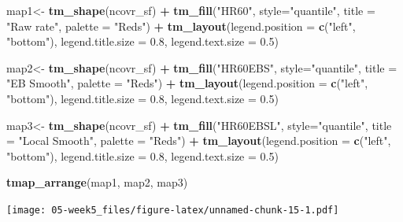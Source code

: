 \documentclass[]{book}
\newenvironment{Shaded}{\begin{snugshade}}{\end{snugshade}}
\newcommand{\DataTypeTok}[1]{\textcolor[rgb]{0.13,0.29,0.53}{#1}}
\newcommand{\FloatTok}[1]{\textcolor[rgb]{0.00,0.00,0.81}{#1}}
\newcommand{\KeywordTok}[1]{\textcolor[rgb]{0.13,0.29,0.53}{\textbf{#1}}}
\newcommand{\NormalTok}[1]{#1}
\newcommand{\OperatorTok}[1]{\textcolor[rgb]{0.81,0.36,0.00}{\textbf{#1}}}
\newcommand{\StringTok}[1]{\textcolor[rgb]{0.31,0.60,0.02}{#1}}
\begin{document}
\begin{Shaded}
\begin{Highlighting}[]
\NormalTok{map1<-}\StringTok{ }\KeywordTok{tm_shape}\NormalTok{(ncovr_sf) }\OperatorTok{+}\StringTok{ }
\StringTok{  }\KeywordTok{tm_fill}\NormalTok{(}\StringTok{"HR60"}\NormalTok{, }\DataTypeTok{style=}\StringTok{"quantile"}\NormalTok{, }\DataTypeTok{title =} \StringTok{"Raw rate"}\NormalTok{, }\DataTypeTok{palette =} \StringTok{"Reds"}\NormalTok{) }\OperatorTok{+}
\StringTok{  }\KeywordTok{tm_layout}\NormalTok{(}\DataTypeTok{legend.position =} \KeywordTok{c}\NormalTok{(}\StringTok{"left"}\NormalTok{, }\StringTok{"bottom"}\NormalTok{), }
            \DataTypeTok{legend.title.size =} \FloatTok{0.8}\NormalTok{,}
            \DataTypeTok{legend.text.size =} \FloatTok{0.5}\NormalTok{)}

\NormalTok{map2<-}\StringTok{ }\KeywordTok{tm_shape}\NormalTok{(ncovr_sf) }\OperatorTok{+}\StringTok{ }
\StringTok{  }\KeywordTok{tm_fill}\NormalTok{(}\StringTok{"HR60EBS"}\NormalTok{, }\DataTypeTok{style=}\StringTok{"quantile"}\NormalTok{, }\DataTypeTok{title =} \StringTok{"EB Smooth"}\NormalTok{, }\DataTypeTok{palette =} \StringTok{"Reds"}\NormalTok{) }\OperatorTok{+}
\StringTok{  }\KeywordTok{tm_layout}\NormalTok{(}\DataTypeTok{legend.position =} \KeywordTok{c}\NormalTok{(}\StringTok{"left"}\NormalTok{, }\StringTok{"bottom"}\NormalTok{), }
            \DataTypeTok{legend.title.size =} \FloatTok{0.8}\NormalTok{,}
            \DataTypeTok{legend.text.size =} \FloatTok{0.5}\NormalTok{)}

\NormalTok{map3<-}\StringTok{ }\KeywordTok{tm_shape}\NormalTok{(ncovr_sf) }\OperatorTok{+}\StringTok{ }
\StringTok{  }\KeywordTok{tm_fill}\NormalTok{(}\StringTok{"HR60EBSL"}\NormalTok{, }\DataTypeTok{style=}\StringTok{"quantile"}\NormalTok{, }\DataTypeTok{title =} \StringTok{"Local Smooth"}\NormalTok{, }\DataTypeTok{palette =} \StringTok{"Reds"}\NormalTok{) }\OperatorTok{+}
\StringTok{  }\KeywordTok{tm_layout}\NormalTok{(}\DataTypeTok{legend.position =} \KeywordTok{c}\NormalTok{(}\StringTok{"left"}\NormalTok{, }\StringTok{"bottom"}\NormalTok{), }
            \DataTypeTok{legend.title.size =} \FloatTok{0.8}\NormalTok{,}
            \DataTypeTok{legend.text.size =} \FloatTok{0.5}\NormalTok{)}

\KeywordTok{tmap_arrange}\NormalTok{(map1, map2, map3) }
\end{Highlighting}
\end{Shaded}

\texttt{[image: 05-week5\_files/figure-latex/unnamed-chunk-15-1.pdf]}
\end{document}
